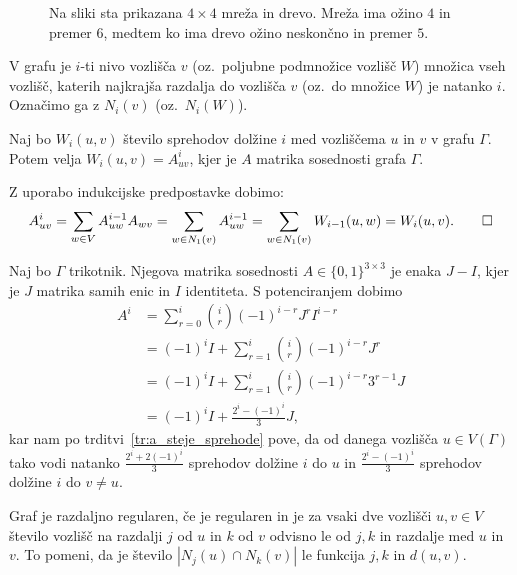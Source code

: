 \documentclass[fin1, tisk]{fmfdelo}
\begin{document}
\begin{figure}[ht]
    \centering
    \def\svgwidth{\columnwidth}
    \caption{Na sliki sta prikazana $4\times 4$ mreža in drevo. Mreža ima ožino $4$ in premer $6$, 
        medtem ko ima drevo ožino neskončno in premer $5$.}
    \label{fig:grid}
\end{figure}

\begin{definicija}\label{def:nivo}
    V grafu je $i$-ti nivo vozlišča $v$ (oz.~poljubne podmnožice vozlišč $W$) množica vseh vozlišč, katerih najkrajša razdalja
    do vozlišča $v$ (oz.~do množice $W$) je natanko $i$. Označimo ga z $N_i(v)$ (oz.~$N_i(W)$).
\end{definicija}

\begin{trditev}\label{tr:a_steje_sprehode}
    Naj bo $W_i(u,v)$ število sprehodov dolžine $i$ med vozliščema $u$ in $v$ v grafu $\Gamma$.
    Potem velja $W_i(u, v) = A^i_{uv}$,
    kjer je $A$ matrika sosednosti grafa $\Gamma$.
\end{trditev}
\begin{dokaz}
    Z uporabo indukcijske predpostavke dobimo:
    \[A^i_{uv} = \sum_{w\in V} A^{i-1}_{uw}A_{wv} = \sum_{w\in N_1(v)} A^{i-1}_{uw} = \sum_{w\in N_1(v)} W_{i-1}(u, w) = W_i(u, v). \qedhere\]
\end{dokaz}

\begin{zgled}
    Naj bo $\Gamma$ trikotnik. Njegova matrika sosednosti $A\in\{0,1\}^{3\times 3}$ je enaka $J - I$, kjer je $J$ matrika samih enic in $I$ identiteta. 
    S potenciranjem dobimo 
    \begin{align*}
    A^i &= \sum_{r=0}^i \binom{i}{r}(-1)^{i-r}J^r I^{i-r} \\
    &= (-1)^iI + \sum_{r=1}^i \binom{i}{r}(-1)^{i-r}J^r \\
    &= (-1)^iI + \sum_{r=1}^i \binom{i}{r}(-1)^{i-r}3^{r-1}J \\
    &= (-1)^iI + \frac{2^i - (-1)^i}{3} J,
    \end{align*}
    kar nam po trditvi~\ref{tr:a_steje_sprehode} pove, da od danega vozlišča $u\in V(\Gamma)$ tako vodi natanko $\frac{2^i + 2(-1)^i}{3}$ sprehodov dolžine 
    $i$ do $u$ in $\frac{2^i - (-1)^i}{3}$ sprehodov dolžine $i$ do $v\neq u$.
\end{zgled}

\begin{definicija}
    Graf je razdaljno regularen, če je regularen in je
    za vsaki dve vozlišči $u, v \in V$
    število vozlišč na razdalji $j$ od $u$ in $k$ od $v$ odvisno 
    le od $j, k$ in razdalje med $u$ in $v$. To pomeni,
    da je število $|N_j(u)\cap N_k(v)|$ le funkcija $j, k$ in $d(u, v)$.
\end{definicija}
\end{document}
